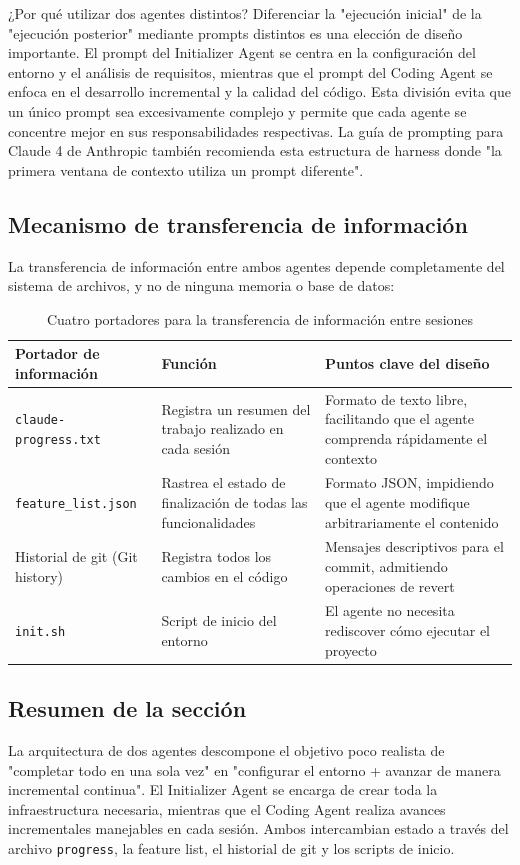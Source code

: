 \begin{knowledgebox}{¿Por qué utilizar dos agentes distintos?}
Diferenciar la "ejecución inicial" de la "ejecución posterior" mediante prompts distintos es una elección de diseño importante. El prompt del Initializer Agent se centra en la configuración del entorno y el análisis de requisitos, mientras que el prompt del Coding Agent se enfoca en el desarrollo incremental y la calidad del código. Esta división evita que un único prompt sea excesivamente complejo y permite que cada agente se concentre mejor en sus responsabilidades respectivas. La guía de prompting para Claude 4 de Anthropic también recomienda esta estructura de harness donde "la primera ventana de contexto utiliza un prompt diferente".
\end{knowledgebox}

\subsection{Mecanismo de transferencia de información}

La transferencia de información entre ambos agentes depende completamente del sistema de archivos, y no de ninguna memoria o base de datos:

\begin{table}[H]
\centering
\begin{tabular}{p{4cm}p{4cm}p{5cm}}
\toprule
\textbf{Portador de información} & \textbf{Función} & \textbf{Puntos clave del diseño} \\
\midrule
\texttt{claude-progress.txt} & Registra un resumen del trabajo realizado en cada sesión & Formato de texto libre, facilitando que el agente comprenda rápidamente el contexto \\
\midrule
\texttt{feature\_list.json} & Rastrea el estado de finalización de todas las funcionalidades & Formato JSON, impidiendo que el agente modifique arbitrariamente el contenido \\
\midrule
Historial de git (Git history) & Registra todos los cambios en el código & Mensajes descriptivos para el commit, admitiendo operaciones de revert \\
\midrule
\texttt{init.sh} & Script de inicio del entorno & El agente no necesita rediscover cómo ejecutar el proyecto \\
\bottomrule
\end{tabular}
\caption{Cuatro portadores para la transferencia de información entre sesiones}
\end{table}

\subsection{Resumen de la sección}

La arquitectura de dos agentes descompone el objetivo poco realista de "completar todo en una sola vez" en "configurar el entorno + avanzar de manera incremental continua". El Initializer Agent se encarga de crear toda la infraestructura necesaria, mientras que el Coding Agent realiza avances incrementales manejables en cada sesión. Ambos intercambian estado a través del archivo \texttt{progress}, la feature list, el historial de git y los scripts de inicio.

